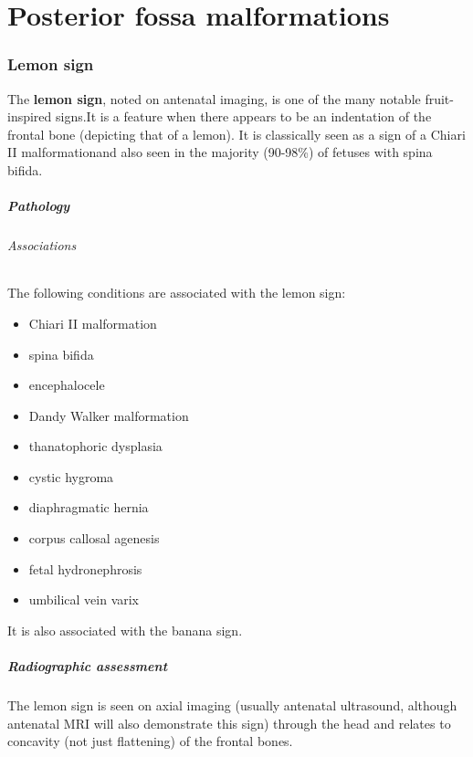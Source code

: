 \chapter{Posterior fossa malformations}

\subsection{Lemon sign}

The \textbf{lemon sign}, noted on antenatal imaging, is one of the many notable fruit-inspired signs.It is a feature when there appears to be an indentation of the frontal bone (depicting that of a lemon). It is classically seen as a sign of a Chiari II malformationand also seen in the majority (90-98\%) of fetuses with spina bifida.

\paragraph{Pathology}

\subparagraph{Associations}

The following conditions are associated with the lemon sign:

\begin{itemize}
	\tightlist
	\item
	Chiari II malformation
	\item
	spina bifida
	\item
	encephalocele
	\item
	Dandy Walker malformation
	\item
	thanatophoric dysplasia
	\item
	cystic hygroma
	\item
	diaphragmatic hernia
	\item
	corpus callosal agenesis
	\item
	fetal hydronephrosis 
	\item
	umbilical vein varix
\end{itemize}

It is also associated with the banana sign.

\paragraph{Radiographic assessment}

The lemon sign is seen on axial imaging (usually antenatal ultrasound, although antenatal MRI will also demonstrate this sign) through the head and relates to concavity (not just flattening) of the frontal bones.

